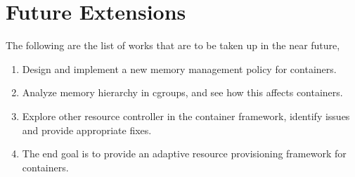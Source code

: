 \chapter{Future Extensions}
  
    The following are the list of works that are to be taken up in the near future,
    
      \begin{enumerate}
	\item Design and implement a new memory management policy for containers.
	\item Analyze memory hierarchy in cgroups, and see how this affects containers.
	\item Explore other resource controller in the container framework, identify issues and provide appropriate fixes.
	\item The end goal is to provide an adaptive resource provisioning framework for containers. 
      \end{enumerate}

  
